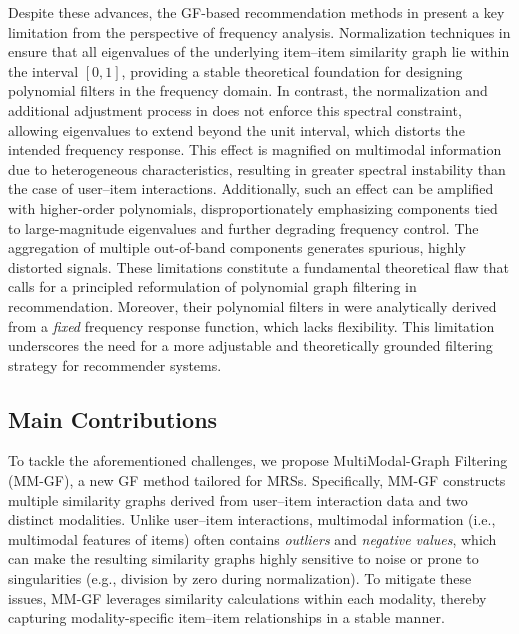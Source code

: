 \documentclass[a4paper,fleqn]{cas-sc}
\renewcommand{\cite}{\citep}
\begin{document}
Despite these advances, the GF-based recommendation methods in \cite{DBLP:conf/sigir/ParkSS24, DBLP:conf/www/ParkYS25, DBLP:conf/www/KimCPS25} present a key limitation from the perspective of frequency analysis. Normalization techniques in \cite{DBLP:conf/cikm/ShenWZSZLL21, DBLP:conf/www/XiaLGLLG22, DBLP:conf/www/LiuLGL0SG23} ensure that all eigenvalues of the underlying item--item similarity graph lie within the interval $[0, 1]$, providing a stable theoretical foundation for designing polynomial filters in the frequency domain. In contrast, the normalization and additional adjustment process in \cite{DBLP:conf/sigir/ParkSS24, DBLP:conf/www/ParkYS25, DBLP:conf/www/KimCPS25} does not enforce this spectral constraint, allowing eigenvalues to extend beyond the unit interval, which distorts the intended frequency response. This effect is magnified on multimodal information due to heterogeneous characteristics, resulting in greater spectral instability than the case of user–item interactions. Additionally, such an effect can be amplified with higher-order polynomials, disproportionately emphasizing components tied to large-magnitude eigenvalues and further degrading frequency control. The aggregation of multiple out-of-band components generates spurious, highly distorted signals. These limitations constitute a fundamental theoretical flaw that calls for a principled reformulation of polynomial graph filtering in recommendation. Moreover, their polynomial filters in \cite{DBLP:conf/sigir/ParkSS24, DBLP:conf/www/ParkYS25, DBLP:conf/www/KimCPS25} were analytically derived from a {\it fixed} frequency response function, which lacks flexibility. This limitation underscores the need for a more adjustable and theoretically grounded filtering strategy for recommender systems.

\subsection{Main Contributions}

To tackle the aforementioned challenges, we propose \textsf{MultiModal-Graph Filtering} (\textsf{MM-GF}), a new GF method tailored for MRSs. Specifically, \textsf{MM-GF} constructs multiple similarity graphs derived from user--item interaction data and two distinct modalities. Unlike user--item interactions, multimodal information (i.e., multimodal features of items) often contains {\it outliers} and {\it negative values}, which can make the resulting similarity graphs highly sensitive to noise or prone to singularities (e.g., division by zero during normalization). To mitigate these issues, \textsf{MM-GF} leverages similarity calculations within each modality, thereby capturing modality-specific item--item relationships in a stable manner.
\end{document}
